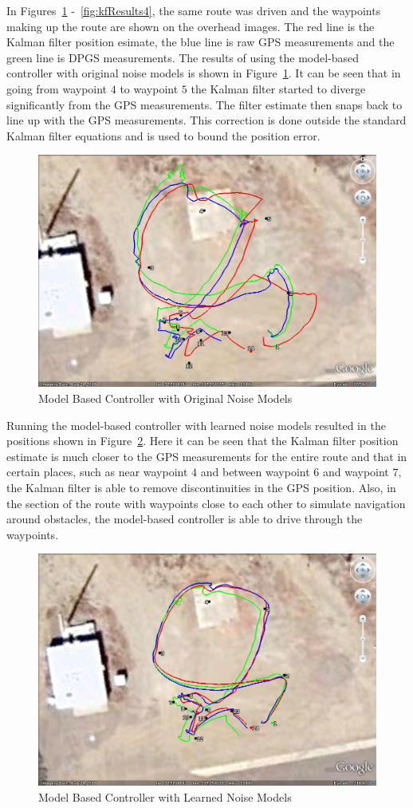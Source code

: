 In Figures~\ref{fig:kfResults1} -~\ref{fig:kfResults4}, the same route was driven and the waypoints making up the route are shown on the overhead images.
The red line is the Kalman filter position esimate, the blue line is raw GPS measurements and the green line is DPGS measurements.
The results of using the model-based controller with original noise models is shown in Figure~\ref{fig:kfResults1}.
It can be seen that in going from waypoint $4$ to waypoint $5$ the Kalman filter started to diverge significantly from the GPS measurements.
The filter estimate then snaps back to line up with the GPS measurements.
This correction is done outside the standard Kalman filter equations and is used to bound the position error.

\begin{figure}[ht!]
\centering
\includegraphics[width=.75\textwidth]{images/GE/20101203_1551_kf_lyapOrigQR}
\caption{Model Based Controller with Original Noise Models}%
\label{fig:kfResults1}
\end{figure}

Running the model-based controller with learned noise models resulted in the positions shown in Figure~\ref{fig:kfResults2}.
Here it can be seen that the Kalman filter position estimate is much closer to the GPS measurements for the entire route and that in certain places, such as near waypoint $4$ and between waypoint $6$ and waypoint $7$, the Kalman filter is able to remove discontinuities in the GPS position.
Also, in the section of the route with waypoints close to each other to simulate navigation around obstacles, the model-based controller is able to drive through the waypoints.

\begin{figure}[ht!]
\centering
\includegraphics[width=.75\textwidth]{images/GE/20101203_1545_kf_lyapNewQR}
\caption{Model Based Controller with Learned Noise Models}%
\label{fig:kfResults2}
\end{figure}

